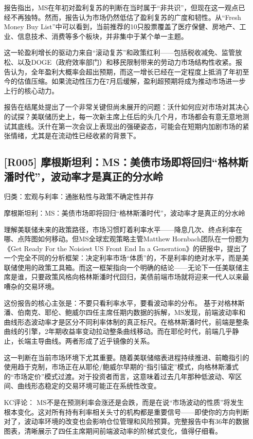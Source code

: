 \documentclass[11pt]{ctexart}
\begin{document}
报告指出，MS在年初对盈利复苏的判断在当时属于“非共识”，但现在这一观点已经不再独特。然而，报告认为市场仍然低估了盈利复苏的广度和韧性。从“Fresh Money Buy List”中可以看到，当前推荐的10只股票覆盖了医疗保健、房地产、工业、信息技术、消费等多个板块，并非集中于某个单一主题。

这一轮盈利增长的驱动力来自“滚动复苏”和政策红利——包括税收减免、监管放松、以及DOGE（政府效率部门）和移民限制带来的劳动力市场结构性收紧。报告认为，全年盈利大概率会超出预期，而这一增长已经在一定程度上抵消了年初至今的估值压缩。如果流动性压力在7月后缓解，盈利超预期将成为推动市场进一步上行的核心动力。

报告在结尾处提出了一个非常关键但尚未展开的问题：沃什如何应对市场对其决心的试探？美联储历史上，每一次新主席上任后的头几个月，市场都会有意无意地测试其底线。沃什在第一次会议上表现出的强硬姿态，可能会在短期内加剧市场的紧张情绪，尤其是在流动性已经收紧的背景下。

\subsection{[R005] 摩根斯坦利：MS：美债市场即将回归“格林斯潘时代”，波动率才是真正的分水岭}
{\small\color{refgray}归类：宏观与利率：通胀粘性与政策不确定性并存}

摩根斯坦利：MS：美债市场即将回归“格林斯潘时代”，波动率才是真正的分水岭

理解美联储未来的政策路径，市场习惯盯着利率水平——降息几次、终点利率在哪、点阵图如何移动。但MS全球宏观策略主管Matthew Hornbach团队在一份题为《Get Ready For the Noisiest US Front End In a Generation》的研报中，提出了一个完全不同的分析框架：决定利率市场“体质”的，不是利率的绝对水平，而是美联储使用的政策工具箱。而这一框架指向一个明确的结论——无论下一任美联储主席是谁，只要政策风格向格林斯潘时代回归，美债前端市场就将迎来一代人以来最嘈杂的交易环境。

这份报告的核心主张是：不要只看利率水平，要看波动率的分布。 基于对格林斯潘、伯南克、耶伦、鲍威尔四任主席任期内数据的拆解，MS发现，前端波动率和曲线形态波动率才是区分不同利率体制的真正标尺。在格林斯潘时代，前端是整条曲线的引擎，2年期收益率变动拉动整条曲线移动。而在耶伦时代，前端几乎静止，长端主导曲线。两者形成了近乎镜像的关系。

这一判断在当前市场环境下尤其重要。随着美联储缩表进程持续推进、前瞻指引的使用趋于克制，市场正在从耶伦/鲍威尔早期的“指引锚定”模式，向格林斯潘式的“市场定价”模式过渡。对于投资者而言，这意味着过去几年那种低波动、窄区间、曲线形态稳定的交易环境可能正在系统性改变。

KC评论： MS不是在预测利率会涨还是会跌，而是在说“市场波动的性质”将发生根本变化。这对所有持有利率相关头寸的机构都是重要信号——即使你的方向判断对了，波动率环境的改变也会影响仓位管理和风险预算。完整报告中有36年的数据图表，清晰展示了四任主席期间前端波动率的阶梯式变化，值得仔细看。
\end{document}
